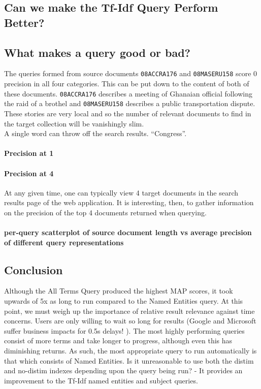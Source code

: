 \documentclass{l4proj}
\newcommand{\code}[1]{\texttt{#1}}
\begin{document}
\subsection{Can we make the Tf-Idf Query Perform Better?}
\subsection{What makes a query good or bad?}
The queries formed from source documents \code{08ACCRA176} and \code{08MASERU158} score 0 precision in all four categories. This can be put down to the content of both of these documents. \code{08ACCRA176} describes a meeting of Ghanaian official following the raid of a brothel and \code{08MASERU158} describes a public transportation dispute. These stories are very local and so the number of relevant documents to find in the target collection will be vanishingly slim. \\
A single word can throw off the search results. ``Congress''. \\

\paragraph{Precision at 1}
\paragraph{Precision at 4}
At any given time, one can typically view 4 target documents in the search results page of the web application. It is interesting, then, to gather information on the precision of the top 4 documents returned when querying.

\paragraph{per-query scatterplot of source document length vs average precision of different query representations}

\subsection{Conclusion} 
Although the All Terms Query produced the highest MAP scores, it took upwards of 5x as long to run compared to the Named Entities query. At this point, we must weigh up the importance of relative result relevance against time concerns. Users are only willing to wait so long for results (Google and Microsoft suffer business impacts for 0.5s delays! \cite{performance}). The most highly performing queries consist of more terms and take longer to progress, although even this has diminishing returns.
As such, the most appropriate query to run automatically is that which consists of Named Entities.
Is it unreasonable to use both the distim and no-distim indexes depending upon the query being run? - It provides an improvement to the Tf-Idf named entities and subject queries.
\end{document}
